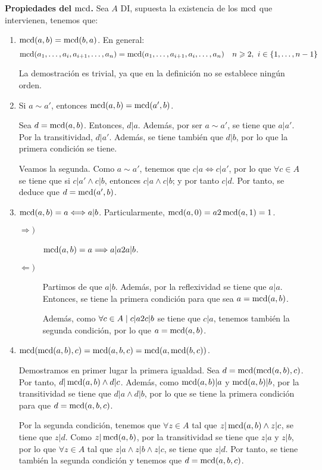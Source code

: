 \textbf{Propiedades del $\operatorname{mcd}$.} Sea $A$ DI, supuesta la existencia de los $\operatorname{mcd}$ que intervienen, tenemos que:
\begin{enumerate}
    \item $\operatorname{mcd}(a,b) = \operatorname{mcd}(b,a)$.
    En general: $$\operatorname{mcd}(a_1, \ldots, a_i, a_{i+1}, \ldots, a_n) = \operatorname{mcd}(a_1, \ldots, a_{i+1}, a_i, \ldots, a_n)~~~n\geqslant2,~i \in \{1, \ldots, n-1\}$$

    La demostración es trivial, ya que en la definición no se establece ningún orden.

    \item Si $a\sim a'$, entonces $\operatorname{mcd}(a,b)=\operatorname{mcd}(a',b)$.

    Sea $d = \operatorname{mcd}(a,b)$. Entonces, $d|a$. Además, por ser $a\sim a'$, se tiene que $a|a'$. Por la transitividad, $d|a'$. Además, se tiene también que $d|b$, por lo que la primera condición se tiene.

    Veamos la segunda. Como $a\sim a'$, tenemos que $c|a\Longleftrightarrow c|a'$, por lo que $\forall c\in A$ se tiene que si $c|a'\land c|b$, entonces $c|a\land c|b$; y por tanto $c|d$. Por tanto, se deduce que 
    $d=\operatorname{mcd}(a',b)$.

    \item $\operatorname{mcd}(a,b)=a \Longleftrightarrow a|b$. Particularmente, $\operatorname{mcd}(a,0) = a 2 \operatorname{mcd}(a,1)=1$.
    \begin{description}
        \item[$\Longrightarrow)$] $\operatorname{mcd}(a,b) = a \Longrightarrow a|a 2 a|b$.

        \item[$\Longleftarrow)$] Partimos de que $a|b$. Además, por la reflexividad se tiene que $a|a$. Entonces, se tiene la primera condición para que sea $a=\operatorname{mcd}(a,b)$.

        Además, como $\forall c \in A \mid c|a 2 c|b$ se tiene que $c|a$, tenemos también la segunda condición, por lo que $a=\operatorname{mcd}(a,b)$.
    \end{description}


    \item $\operatorname{mcd}(\operatorname{mcd}(a,b),c) = \operatorname{mcd}(a,b,c) = \operatorname{mcd}(a, \operatorname{mcd}(b,c))$.

    Demostramos en primer lugar la primera igualdad. Sea $d=\operatorname{mcd}(\operatorname{mcd}(a,b),c)$. Por tanto, $d|\operatorname{mcd}(a,b)\land d|c$. Además, como $\operatorname{mcd}(a,b)|a$ y $\operatorname{mcd}(a,b)|b$, por la transitividad se tiene que $d|a\land d|b$, por lo que se tiene la primera condición para que $d=\operatorname{mcd}(a,b,c)$.

    Por la segunda condición, tenemos que $\forall z\in A$ tal que $z|\operatorname{mcd}(a,b)\land z|c$, se tiene que $z|d$. Como $z|\operatorname{mcd}(a,b)$, por la transitividad se tiene que $z|a$ y $z|b$, por lo que $\forall z\in A$ tal que $z|a\land z|b \land z|c$, se tiene que $z|d$. Por tanto, se tiene también la segunda condición y tenemos que $d=\operatorname{mcd}(a,b,c)$.\\


\end{enumerate}

